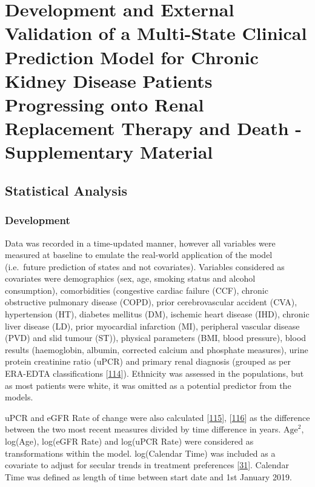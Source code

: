 \documentclass[12pt,PhD,twoside,openright]{muthesis}
\begin{document}
\hypertarget{chap-dev-paper-supp}{%
\chapter{Development and External Validation of a Multi-State Clinical Prediction Model for Chronic Kidney Disease Patients Progressing onto Renal Replacement Therapy and Death - Supplementary Material}\label{chap-dev-paper-supp}}


\hypertarget{statistical-analysis}{%
\section{Statistical Analysis}\label{statistical-analysis}}

\hypertarget{development}{%
\subsection{Development}\label{development}}

Data was recorded in a time-updated manner, however all variables were measured at baseline to emulate the real-world application of the model (i.e.~future prediction of states and not covariates). Variables considered as covariates were demographics (sex, age, smoking status and alcohol consumption), comorbidities (congestive cardiac failure (CCF), chronic obstructive pulmonary disease (COPD), prior cerebrovascular accident (CVA), hypertension (HT), diabetes mellitus (DM), ischemic heart disease (IHD), chronic liver disease (LD), prior myocardial infarction (MI), peripheral vascular disease (PVD) and slid tumour (ST)), physical parameters (BMI, blood pressure), blood results (haemoglobin, albumin, corrected calcium and phosphate measures), urine protein creatinine ratio (uPCR) and primary renal diagnosis (grouped as per ERA-EDTA classifications {[}\protect\hyperlink{ref-venkat-raman_new_2012}{114}{]}). Ethnicity was assessed in the populations, but as most patients were white, it was omitted as a potential predictor from the models.

uPCR and eGFR Rate of change were also calculated {[}\protect\hyperlink{ref-kovesdy_past_2016}{115}{]}, {[}\protect\hyperlink{ref-naimark_past_2016}{116}{]} as the difference between the two most recent measures divided by time difference in years. \(\textrm{Age}^2\), log(Age), log(eGFR Rate) and log(uPCR Rate) were considered as transformations within the model. log(Calendar Time) was included as a covariate to adjust for secular trends in treatment preferences {[}\protect\hyperlink{ref-bhatnagar_epidemiology_2015}{31}{]}. Calendar Time was defined as length of time between start date and 1st January 2019.
\end{document}
